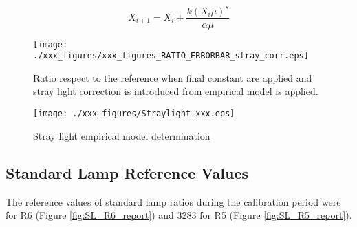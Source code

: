 \begin{equation}	
	X_{i+1}= X_i + \frac { k {(X_i \mu)}^s} { \alpha\mu}
	\label{eq:stray_iter}
\end{equation}  




\begin{figure}[hbtp!]
\begin{center}
		\texttt{[image: ./xxx\_figures/xxx\_figures\_RATIO\_ERRORBAR\_stray\_corr.eps]}
		\caption{Ratio respect to the reference when final constant are applied and stray light correction is introduced from empirical model is applied. }
		\label{fig: Ratio_sl}
\end{center}
\end{figure}

\begin{figure}[hbtp!]
\begin{center}
		\texttt{[image: ./xxx\_figures/Straylight\_xxx.eps]}
		\caption{ Stray light empirical model determination }
		\label{fig:SL_det}
\end{center}
\end{figure}


%
%
%
%
\newpage


\subsection{Standard Lamp Reference Values}


The reference values of standard lamp ratios during the calibration period were \textbf{\slrefNEW} for R6  (Figure \ref{fig:SL_R6_report}) and 3283 for R5 (Figure \ref{fig:SL_R5_report}).

